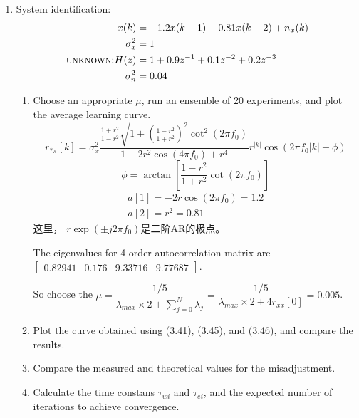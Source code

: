 \documentclass[11pt]{article}
\begin{document}
\begin{enumerate}[itemindent= 0pt]
    \item  System identification:
    $$
    \begin{aligned}
    x(k)&= -1.2x(k-1)-0.81x(k-2)+n_x(k)\\
    \sigma_x^2 &=1\\
    \textsc{unknown:} H(z)&=1+ 0.9z^{-1}+ 0.1z^{-2}+ 0.2z^{-3}\\
    \sigma_n^2 &=0.04
    \end{aligned}
    $$
    \begin{enumerate}[itemindent= -5pt]
    \item Choose an appropriate $\mu$, run an ensemble of 20 experiments, and plot the average learning curve.
    $$
    r_{* \pi}[k]=\sigma_x^{2} \frac{\frac{1+r^{2}}{1-r^{2}} \sqrt{1+\left(\frac{1-r^{2}}{1+r^{2}}\right)^{2} \cot ^{2} \left(2 \pi f_{0}\right)}}{1-2 r^{2} \cos \left(4 \pi f_{0}\right)+r^{4}} r^{|k|} \cos \left(2 \pi f_{0}|k|-\phi\right)
    $$
    $$
    \phi=\arctan \left[\frac{1-r^{2}}{1+r^{2}} \cot \left(2 \pi f_{0}\right)\right]
    $$
    \begin{gather}
    a[1]=-2 r \cos \left( 2 \pi f_{0}\right)=1.2\\
    a[2]=r^{2}=0.81
    \end{gather}
    这里，
    $
    r \exp \left(\pm j 2 \pi f_{0}\right)
    $是二阶AR的极点。

    The eigenvalues for 4-order autocorrelation matrix are $\begin{bmatrix}
    0.82941 &0.176   &9.33716 &9.77687
    \end{bmatrix}$.

    So choose the $\mu= \dfrac{1/5}{\lambda_{max} \times 2 + \sum_{j=0}^{N} \lambda_j }
    =\dfrac{1/5}{\lambda_{max} \times 2 + 4r_{xx}[0] }=0.005 $.
    \item Plot the curve obtained using (3.41), (3.45), and (3.46), and compare the results.
    \item Compare the measured and theoretical values for the misadjustment.
    \item Calculate the time constans $\tau_{wi}$ and $\tau_{ei}$, and the expected number of iterations to achieve convergence.
    \end{enumerate}
\end{enumerate}
\end{document}
